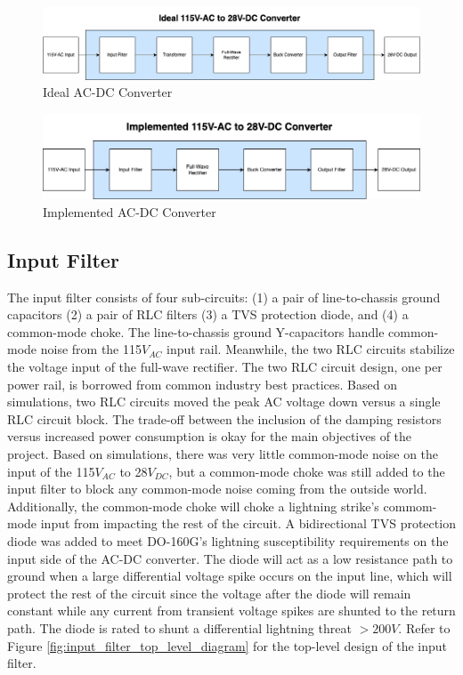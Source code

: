 \documentclass[conference]{IEEEtran}
\begin{document}
\begin{figure}[htbp]
    \centering
    \includegraphics[width=1.0\linewidth]{ac_dc_converter_ideal.png}
    \caption{Ideal AC-DC Converter}
    \label{fig:ac_dc_converter_ideal_diagram}
\end{figure}

\begin{figure}[h]
    \centering
    \includegraphics[width=1.0\linewidth]{ac_dc_converter_implemented.png}
    \caption{Implemented AC-DC Converter}
    \label{fig:ac_dc_converter_implemented_diagram}
\end{figure}

\subsection{Input Filter}

The input filter consists of four sub-circuits: (1) a pair of line-to-chassis ground capacitors (2) a pair of RLC filters (3) a TVS protection diode, and (4) a common-mode choke. The line-to-chassis ground Y-capacitors handle common-mode noise from the 115$V_{AC}$ input rail. Meanwhile, the two RLC circuits stabilize the voltage input of the full-wave rectifier. The two RLC circuit design, one per power rail, is borrowed from common industry best practices. Based on simulations, two RLC circuits moved the peak AC voltage down versus a single RLC circuit block. The trade-off between the inclusion of the damping resistors versus increased power consumption is okay for the main objectives of the project. Based on simulations, there was very little common-mode noise on the input of the 115$V_{AC}$ to 28$V_{DC}$, but a common-mode choke was still added to the input filter to block any common-mode noise coming from the outside world. Additionally, the common-mode choke will choke a lightning strike's commom-mode  input from impacting the rest of the circuit. A bidirectional TVS protection diode was added to meet DO-160G's lightning susceptibility requirements on the input side of the AC-DC converter. The diode will act as a low resistance path to ground when a large differential voltage spike occurs on the input line, which will protect the rest of the circuit since the voltage after the diode will remain constant while any current from transient voltage spikes are shunted to the return path. The diode is rated to shunt a differential lightning threat $>200V$. Refer to Figure \ref{fig:input_filter_top_level_diagram} for the top-level design of the input filter. 
\end{document}
